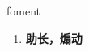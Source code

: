 
\begin{frame}
{\huge foment}
\begin{center}
\begin{enumerate}\Large
  \item \textbf{助长，煽动}
\end{enumerate}
\end{center}
\end{frame}
